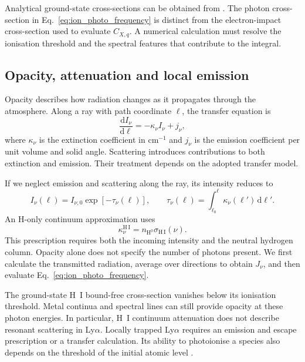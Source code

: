 Analytical ground-state cross-sections can be obtained from
\cite{verner1996}. The photon cross-section in
Eq.~\eqref{eq:ion_photo_frequency} is distinct from the electron-impact
cross-section used to evaluate \(C_{X,q}\). A numerical calculation must
resolve the ionisation threshold and the spectral features that contribute
to the integral.

\subsection{Opacity, attenuation and local emission}
\label{subsec:ion_radiative_transfer}

Opacity describes how radiation changes as it propagates through the
atmosphere. Along a ray with path coordinate \(\ell\), the transfer equation is
\begin{equation}
 \frac{\mathrm d I_\nu}{\mathrm d\ell}
 =-\kappa_\nu I_\nu+j_\nu,
 \label{eq:ion_transfer}
\end{equation}
where \(\kappa_\nu\) is the extinction coefficient in
\(\mathrm{cm^{-1}}\) and \(j_\nu\) is the emission coefficient per unit volume
and solid angle. Scattering introduces contributions to both extinction and
emission. Their treatment depends on the adopted transfer model.

If we neglect emission and scattering along the ray, its intensity reduces to
\begin{equation}
 I_\nu(\ell)=I_{\nu,0}\exp[-\tau_\nu(\ell)],
 \qquad
 \tau_\nu(\ell)=\int_{\ell_0}^{\ell}\kappa_\nu(\ell')\,\mathrm d\ell'.
 \label{eq:ion_attenuation}
\end{equation}
An H-only continuum approximation uses
\begin{equation}
 \kappa_\nu^{\mathrm{H\,I}}
 =n_{\mathrm{H^0}}\sigma_{\mathrm{H\,I}}(\nu).
 \label{eq:ion_h_opacity}
\end{equation}
This prescription requires both the incoming intensity and the neutral
hydrogen column. Opacity alone does not specify the number of photons present.
We first calculate the transmitted radiation, average over directions to
obtain \(J_\nu\), and then evaluate
Eq.~\eqref{eq:ion_photo_frequency}.

The ground-state H~I bound-free cross-section vanishes below its ionisation
threshold. Metal continua and spectral lines can still provide opacity at
these photon energies. In particular, H~I continuum attenuation does not
describe resonant scattering in Ly\(\alpha\). Locally trapped Ly\(\alpha\)
requires an emission and escape prescription or a transfer calculation.
Its ability to photoionise a species also depends on the threshold of the
initial atomic level \cite{laming2015,dufresne2025}.

